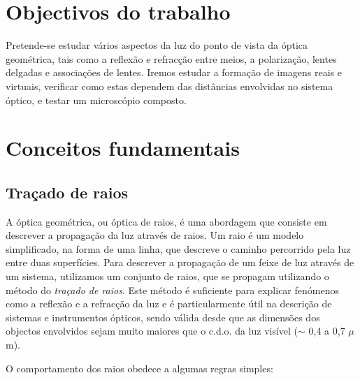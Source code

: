 \documentclass[a4paper,twoside,11pt]{report}      %
\begin{document}
\section{\sf Objectivos do trabalho}


Pretende-se estudar vários aspectos da luz do ponto de vista da óptica geométrica, tais como a reflexão e refracção entre meios, a polarização, lentes delgadas e associações de lentes. Iremos estudar a formação de imagens reais e virtuais, verificar como estas dependem das distâncias envolvidas no sistema óptico, e testar um microscópio composto.

\section{\sf Conceitos fundamentais}
\subsection{\sf Traçado de raios}
A óptica geométrica, ou óptica de raios, é uma abordagem que consiste em descrever a propagação da luz através de raios. Um raio é um modelo simplificado, na forma de uma linha, que descreve o caminho percorrido pela luz entre duas superfícies. Para descrever a propagação de um feixe de luz através de um sistema, utilizamos um conjunto de raios, que se propagam utilizando o método do \emph{traçado de raios}.
Este método é suficiente para explicar fenómenos como a reflexão e a refracção da luz e é particularmente útil na descrição de sistemas e instrumentos ópticos, sendo válida desde que as dimensões dos objectos envolvidos sejam muito maiores que o c.d.o. da luz visível ($\sim$ 0,4 a 0,7 $\mu$m).

O comportamento dos raios obedece a algumas regras simples:
\end{document}
